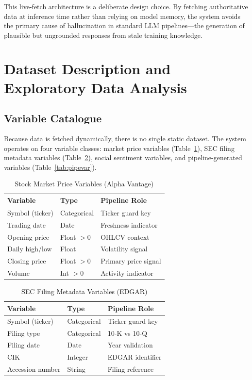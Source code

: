 \documentclass[10pt,journal,compsoc]{IEEEtran}
\begin{document}
This live-fetch architecture is a deliberate design choice.
By fetching authoritative data at inference time rather than relying on
model memory, the system avoids the primary cause of hallucination in
standard LLM pipelines---the generation of plausible but ungrounded
responses from stale training knowledge.

\section{Dataset Description and Exploratory Data Analysis}
\label{sec:eda}

\subsection{Variable Catalogue}

Because data is fetched dynamically, there is no single static dataset.
The system operates on four variable classes: market price variables
(Table~\ref{tab:mktvar}), SEC filing metadata variables
(Table~\ref{tab:secvar}), social sentiment variables, and
pipeline-generated variables (Table~\ref{tab:pipevar}).

\begin{table}[htbp]
\caption{Stock Market Price Variables (Alpha Vantage)}
\label{tab:mktvar}
\centering
\small
\begin{tabular}{@{}lll@{}}
\toprule
\textbf{Variable} & \textbf{Type} & \textbf{Pipeline Role} \\
\midrule
Symbol (ticker) & Categorical & Ticker guard key \\
Trading date    & Date        & Freshness indicator \\
Opening price   & Float $>0$  & OHLCV context \\
Daily high/low  & Float       & Volatility signal \\
Closing price   & Float $>0$  & Primary price signal \\
Volume          & Int $>0$    & Activity indicator \\
\bottomrule
\end{tabular}
\end{table}

\begin{table}[htbp]
\caption{SEC Filing Metadata Variables (EDGAR)}
\label{tab:secvar}
\centering
\small
\begin{tabular}{@{}lll@{}}
\toprule
\textbf{Variable} & \textbf{Type} & \textbf{Pipeline Role} \\
\midrule
Symbol (ticker)  & Categorical & Ticker guard key \\
Filing type      & Categorical & 10-K vs 10-Q \\
Filing date      & Date        & Year validation \\
CIK              & Integer     & EDGAR identifier \\
Accession number & String      & Filing reference \\
\bottomrule
\end{tabular}
\end{table}
\end{document}
